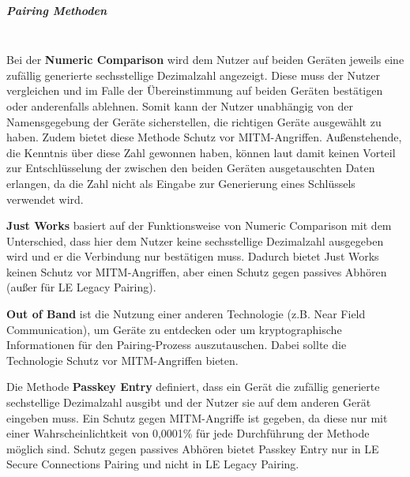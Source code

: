 \subparagraph{Pairing Methoden} \mbox{} \vspace{0.2cm} \\
Bei der \textbf{Numeric Comparison} wird dem Nutzer auf beiden Geräten jeweils eine zufällig generierte sechsstellige Dezimalzahl angezeigt. Diese muss der Nutzer vergleichen und im Falle der Übereinstimmung auf beiden Geräten bestätigen oder anderenfalls ablehnen. Somit kann der Nutzer unabhängig von der Namensgegebung der Geräte sicherstellen, die richtigen Geräte ausgewählt zu haben. Zudem bietet diese Methode Schutz vor MITM-Angriffen. Außenstehende, die Kenntnis über diese Zahl gewonnen haben, können laut \cite{BtSpec4.2_244-245} damit keinen Vorteil zur Entschlüsselung der zwischen den beiden Geräten ausgetauschten Daten erlangen, da die Zahl nicht als Eingabe zur Generierung eines Schlüssels verwendet wird.

\textbf{Just Works} basiert auf der Funktionsweise von Numeric Comparison mit dem Unterschied, dass hier dem Nutzer keine sechsstellige Dezimalzahl ausgegeben wird und er die Verbindung nur bestätigen muss. Dadurch bietet Just Works keinen Schutz vor MITM-Angriffen, aber einen Schutz gegen passives Abhören (außer für LE Legacy Pairing). \cite{BtSpec4.2_245}

\textbf{Out of Band} ist die Nutzung einer anderen Technologie (z.B. Near Field Communication), um Geräte zu entdecken oder um kryptographische Informationen für den Pairing-Prozess auszutauschen. Dabei sollte die Technologie Schutz vor MITM-Angriffen bieten. \cite{BtSpec4.2_246}

Die Methode \textbf{Passkey Entry} definiert, dass ein Gerät die zufällig generierte sechstellige Dezimalzahl ausgibt und der Nutzer sie auf dem anderen Gerät eingeben muss. Ein Schutz gegen MITM-Angriffe ist gegeben, da diese nur mit einer Wahrscheinlichtkeit von 0,0001\% für jede Durchführung der Methode möglich sind. Schutz gegen passives Abhören bietet Passkey Entry nur in LE Secure Connections Pairing und nicht in LE Legacy Pairing. \cite{BtSpec4.2_246-247} \cite{BtSpec4.2_2304}

